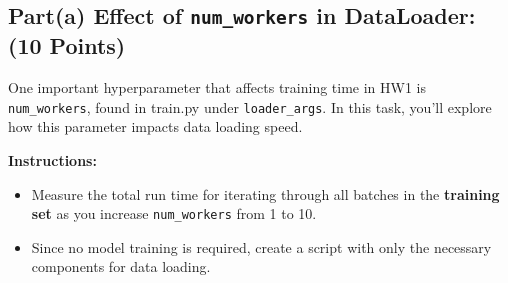 \documentclass[11pt, oneside]{article}   	%
\begin{document}
\subsection*{Part(a) Effect of \texttt{num\_workers} in DataLoader: (10 Points)}
One important hyperparameter that affects training time in HW1 is \texttt{num\_workers}, found in train.py under \texttt{loader\_args}. In this task, you’ll explore how this parameter impacts data loading speed.

\textbf{Instructions:}
\begin{itemize}
    \item Measure the total run time for iterating through all batches in the \textbf{training set} as you increase \texttt{num\_workers} from 1 to 10.
    \item Since no model training is required, create a script with only the necessary components for data loading.
\end{itemize}
\end{document}
